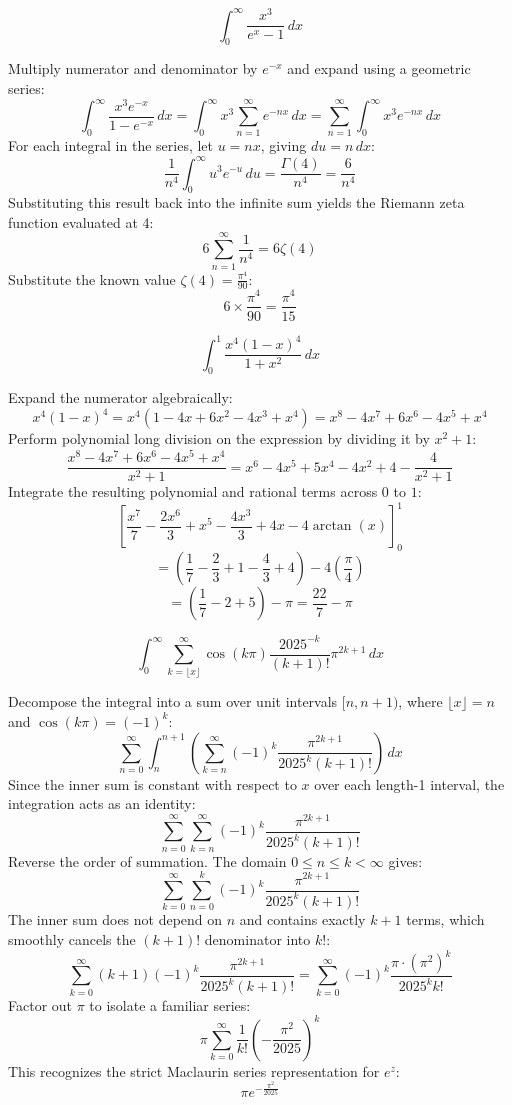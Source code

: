 \begin{questions}
    \question \[ \int_0^\infty \frac{x^3}{e^x - 1} \,dx \]
    \begin{solution}
        Multiply numerator and denominator by $e^{-x}$ and expand using a geometric series:
        \[ \int_0^\infty \frac{x^3 e^{-x}}{1 - e^{-x}} \,dx = \int_0^\infty x^3 \sum_{n=1}^\infty e^{-nx} \,dx = \sum_{n=1}^\infty \int_0^\infty x^3 e^{-nx} \,dx \]
        For each integral in the series, let $u = nx$, giving $du = n \,dx$:
        \[ \frac{1}{n^4} \int_0^\infty u^3 e^{-u} \,du = \frac{\Gamma(4)}{n^4} = \frac{6}{n^4} \]
        Substituting this result back into the infinite sum yields the Riemann zeta function evaluated at 4:
        \[ 6 \sum_{n=1}^\infty \frac{1}{n^4} = 6 \zeta(4) \]
        Substitute the known value $\zeta(4) = \frac{\pi^4}{90}$:
        \[ 6 \times \frac{\pi^4}{90} = \frac{\pi^4}{15} \]
    \end{solution}

    \question \[ \int_0^1 \frac{x^4(1-x)^4}{1+x^2} \,dx \]
    \begin{solution}
        Expand the numerator algebraically:
        \[ x^4(1-x)^4 = x^4(1 - 4x + 6x^2 - 4x^3 + x^4) = x^8 - 4x^7 + 6x^6 - 4x^5 + x^4 \]
        Perform polynomial long division on the expression by dividing it by $x^2 + 1$:
        \[ \frac{x^8 - 4x^7 + 6x^6 - 4x^5 + x^4}{x^2+1} = x^6 - 4x^5 + 5x^4 - 4x^2 + 4 - \frac{4}{x^2+1} \]
        Integrate the resulting polynomial and rational terms across $0$ to $1$:
        \[ \left[ \frac{x^7}{7} - \frac{2x^6}{3} + x^5 - \frac{4x^3}{3} + 4x - 4\arctan(x) \right]_0^1 \]
        \[ = \left( \frac{1}{7} - \frac{2}{3} + 1 - \frac{4}{3} + 4 \right) - 4\left(\frac{\pi}{4}\right) \]
        \[ = \left( \frac{1}{7} - 2 + 5 \right) - \pi = \frac{22}{7} - \pi \]
    \end{solution}

    \question \[ \int_0^\infty \sum_{k=\lfloor x \rfloor}^\infty \cos(k\pi) \frac{2025^{-k}}{(k+1)!} \pi^{2k+1} \,dx \]
    \begin{solution}
        Decompose the integral into a sum over unit intervals $[n, n+1)$, where $\lfloor x \rfloor = n$ and $\cos(k\pi) = (-1)^k$:
        \[ \sum_{n=0}^\infty \int_n^{n+1} \left( \sum_{k=n}^\infty (-1)^k \frac{\pi^{2k+1}}{2025^k (k+1)!} \right) \,dx \]
        Since the inner sum is constant with respect to $x$ over each length-1 interval, the integration acts as an identity:
        \[ \sum_{n=0}^\infty \sum_{k=n}^\infty (-1)^k \frac{\pi^{2k+1}}{2025^k (k+1)!} \]
        Reverse the order of summation. The domain $0 \le n \le k < \infty$ gives:
        \[ \sum_{k=0}^\infty \sum_{n=0}^k (-1)^k \frac{\pi^{2k+1}}{2025^k (k+1)!} \]
        The inner sum does not depend on $n$ and contains exactly $k+1$ terms, which smoothly cancels the $(k+1)!$ denominator into $k!$:
        \[ \sum_{k=0}^\infty (k+1) (-1)^k \frac{\pi^{2k+1}}{2025^k (k+1)!} = \sum_{k=0}^\infty (-1)^k \frac{\pi \cdot (\pi^2)^k}{2025^k k!} \]
        Factor out $\pi$ to isolate a familiar series:
        \[ \pi \sum_{k=0}^\infty \frac{1}{k!} \left(-\frac{\pi^2}{2025}\right)^k \]
        This recognizes the strict Maclaurin series representation for $e^z$:
        \[ \pi e^{-\frac{\pi^2}{2025}} \]
    \end{solution}
\end{questions}